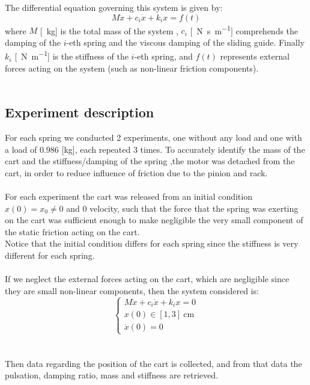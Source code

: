 The differential equation governing this system is given by:
$$M\ddot{x}+c_i\dot{x}+k_i x = f(t)$$
where $M$ [\SI{}{\kilo \gram}] is the total mass of the system  , $c_i$ [\SI{}{\newton \second \per \meter }] comprehends the damping of the $i$-eth spring and the viscous damping of the sliding guide. Finally $k_i$ [\SI{}{\newton \per \meter}] is the stiffness of the $i$-eth spring, and $f(t)$ represents external forces acting on the system (such as non-linear friction components). 
\\ \\
\subsection{Experiment description}
For each spring we conducted 2 experiments, one without any load and one with a load of $0.986$ [\si{\kg}], each repeated 3 times. To accurately identify the mass of the cart and the stiffness/damping of the spring ,the motor was detached from the cart, in order to reduce influence of friction due to the pinion and rack. \\\\
For each experiment the  cart was released from an initial condition $x(0) =x_0 \neq 0$ and $0$ velocity,  such that the force that the spring was exerting on the cart was sufficient enough to  make negligible the very small component of the static friction acting on the cart. \\ Notice that the initial condition differs for each spring since the stiffness is very different for each spring. \\\\
If we neglect the external forces acting on the cart, which are negligible since they are small non-linear components, then the system considered is:
\begin{equation} \label{eq:cart_detached_motor}
\begin{cases}
M\ddot{x}+c_i\dot{x}+k_i x = 0 \\
x(0) \in [1,3] \SI{}{\cm} \\
\dot{x}(0)=0
\end{cases}
\end{equation} \\ \\
Then data regarding the position of the cart is collected, and from that data the pulsation, damping ratio, mass and stiffness are retrieved.


